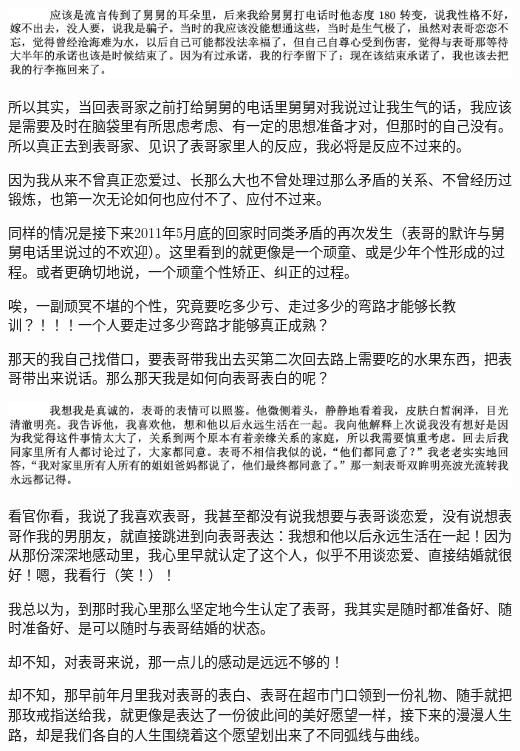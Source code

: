 \documentclass[9pt, b5paper]{article}
\begin{document}
\begin{center}
\includegraphics[width=.9\linewidth]{./pic/p1p49-4.png}
\end{center}

所以其实，当回表哥家之前打给舅舅的电话里舅舅对我说过让我生气的话，我应该是需要及时在脑袋里有所思虑考虑、有一定的思想准备才对，但那时的自己没有。所以真正去到表哥家、见识了表哥家里人的反应，我必将是反应不过来的。

因为我从来不曾真正恋爱过、长那么大也不曾处理过那么矛盾的关系、不曾经历过锻炼，也第一次无论如何也应付不了、应付不过来。

同样的情况是接下来2011年5月底的回家时同类矛盾的再次发生（表哥的默许与舅舅电话里说过的不欢迎）。这里看到的就更像是一个顽童、或是少年个性形成的过程。或者更确切地说，一个顽童个性矫正、纠正的过程。

唉，一副顽冥不堪的个性，究竟要吃多少亏、走过多少的弯路才能够长教训？！！！一个人要走过多少弯路才能够真正成熟？

那天的我自己找借口，要表哥带我出去买第二次回去路上需要吃的水果东西，把表哥带出来说话。那么那天我是如何向表哥表白的呢？

\begin{center}
\includegraphics[width=.9\linewidth]{./pic/p1p50-5.png}
\end{center}

看官你看，我说了我喜欢表哥，我甚至都没有说我想要与表哥谈恋爱，没有说想表哥作我的男朋友，就直接跳进到向表哥表达：我想和他以后永远生活在一起！因为从那份深深地感动里，我心里早就认定了这个人，似乎不用谈恋爱、直接结婚就很好！嗯，我看行（笑！）！

我总以为，到那时我心里那么坚定地今生认定了表哥，我其实是随时都准备好、随时准备好、是可以随时与表哥结婚的状态。

却不知，对表哥来说，那一点儿的感动是远远不够的！

却不知，那早前年月里我对表哥的表白、表哥在超市门口领到一份礼物、随手就把那玫戒指送给我，就更像是表达了一份彼此间的美好愿望一样，接下来的漫漫人生路，却是我们各自的人生围绕着这个愿望划出来了不同弧线与曲线。 
\end{document}
